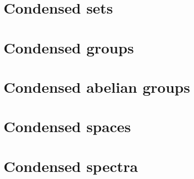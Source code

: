 \documentclass{cambridge7A}
\begin{document}



\part{Condensed sets}%
\label{prt:condensed_sets}

\noindent 


\part{Condensed groups}%
\label{prt:condensed_groups}

\noindent 


\part{Condensed abelian groups}%
\label{prt:condensed_abelian_groups}

\noindent 


\part{Condensed spaces}%
\label{prt:condensed_spaces}

\noindent 


\part{Condensed spectra}%
\label{prt:condensed_spectra}

\noindent 


\backmatter

%
%

\end{document}
